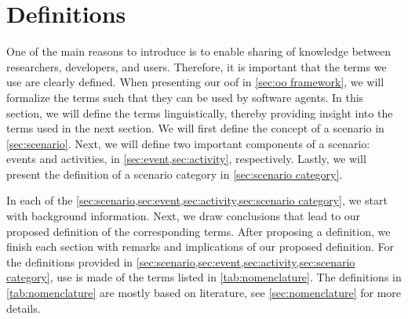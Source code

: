 \section{Definitions}
\label{sec:definitions}

One of the main reasons to introduce \cstartb {} \cendb is to enable sharing of knowledge between researchers, developers, and users. 
Therefore, it is important that the terms we use are clearly defined. 
When presenting our \cstartb \ac{oof} \cendb in \cref{sec:oo framework}, we will formalize the terms such that they can be used by software agents.
In this section, we will define the terms linguistically, thereby providing insight into the terms used in the next section.
We will first define the concept of a scenario in \cref{sec:scenario}. 
Next, we will define two important components of a scenario: events and activities, in \cref{sec:event,sec:activity}, respectively. 
Lastly, we will present the definition of a scenario category in \cref{sec:scenario category}.

In each of the \cref{sec:scenario,sec:event,sec:activity,sec:scenario category}, we start with background information. Next, we draw conclusions that lead to our proposed definition of the corresponding terms. After proposing a definition, we finish each section with remarks and implications of our proposed definition.
\cstartc For the definitions provided in \cref{sec:scenario,sec:event,sec:activity,sec:scenario category}, use is made of the terms listed in \cref{tab:nomenclature}. The definitions in \cref{tab:nomenclature} are mostly based on literature, see \cref{sec:nomenclature} for more details. \cendc


